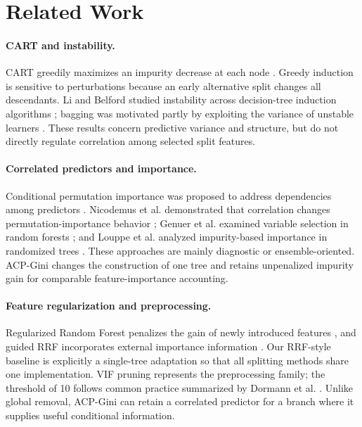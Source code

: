 \documentclass[runningheads]{llncs}
\begin{document}
\section{Related Work}
\paragraph{CART and instability.} CART greedily maximizes an impurity decrease at each node \cite{breiman1984cart}. Greedy induction is sensitive to perturbations because an early alternative split changes all descendants. Li and Belford studied instability across decision-tree induction algorithms \cite{li2002instability}; bagging was motivated partly by exploiting the variance of unstable learners \cite{breiman1996bagging}. These results concern predictive variance and structure, but do not directly regulate correlation among selected split features.

\paragraph{Correlated predictors and importance.} Conditional permutation importance was proposed to address dependencies among predictors \cite{strobl2008conditional}. Nicodemus et al. demonstrated that correlation changes permutation-importance behavior \cite{nicodemus2010correlation}; Genuer et al. examined variable selection in random forests \cite{genuer2010selection}; and Louppe et al. analyzed impurity-based importance in randomized trees \cite{louppe2013importance}. These approaches are mainly diagnostic or ensemble-oriented. ACP-Gini changes the construction of one tree and retains unpenalized impurity gain for comparable feature-importance accounting.

\paragraph{Feature regularization and preprocessing.} Regularized Random Forest penalizes the gain of newly introduced features \cite{deng2012rrf}, and guided RRF incorporates external importance information \cite{deng2013grrf}. Our RRF-style baseline is explicitly a single-tree adaptation so that all splitting methods share one implementation. VIF pruning represents the preprocessing family; the threshold of 10 follows common practice summarized by Dormann et al. \cite{dormann2013collinearity}. Unlike global removal, ACP-Gini can retain a correlated predictor for a branch where it supplies useful conditional information.
\end{document}
